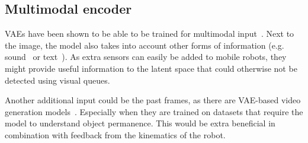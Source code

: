 \subsection{Multimodal encoder}
VAEs have been shown to be able to be trained for multimodal input~\cite{sadok2024multimodal,shi2019variational,sutter2021generalized,suzuki2016joint,wu2018multimodal}. Next to the image, the model also takes into account other forms of information (e.g. sound~\cite{sadok2024multimodal} or text~\cite{suzuki2016joint}). As extra sensors can easily be added to mobile robots, they might provide useful information to the latent space that could otherwise not be detected using visual queues.

Another additional input could be the past frames, as there are VAE-based video generation models~\cite{yan2021videogpt}. Especially when they are trained on datasets that require the model to understand object permanence. This would be extra beneficial in combination with feedback from the kinematics of the robot.

